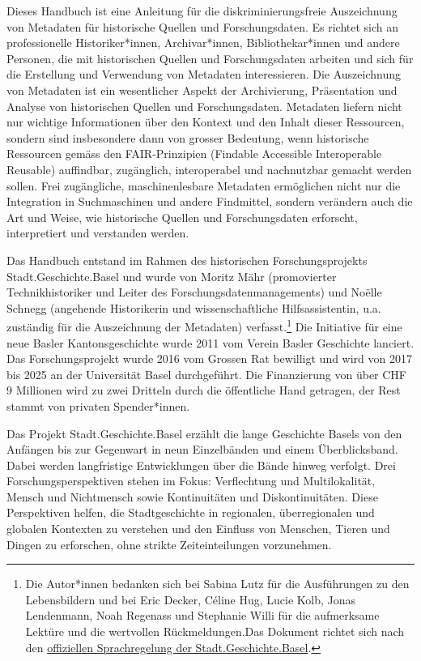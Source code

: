 \documentclass[
  letterpaper,
  DIV=11,
  numbers=noendperiod]{scrartcl}
\begin{document}
Dieses Handbuch ist eine Anleitung für die diskriminierungsfreie
Auszeichnung von Metadaten für historische Quellen und Forschungsdaten.
Es richtet sich an professionelle Historiker*innen, Archivar*innen,
Bibliothekar*innen und andere Personen, die mit historischen Quellen und
Forschungsdaten arbeiten und sich für die Erstellung und Verwendung von
Metadaten interessieren. Die Auszeichnung von Metadaten ist ein
wesentlicher Aspekt der Archivierung, Präsentation und Analyse von
historischen Quellen und Forschungsdaten. Metadaten liefern nicht nur
wichtige Informationen über den Kontext und den Inhalt dieser
Ressourcen, sondern sind insbesondere dann von grosser Bedeutung, wenn
historische Ressourcen gemäss den FAIR-Prinzipien (Findable Accessible
Interoperable Reusable) auffindbar, zugänglich, interoperabel und
nachnutzbar gemacht werden sollen. Frei zugängliche, maschinenlesbare
Metadaten ermöglichen nicht nur die Integration in Suchmaschinen und
andere Findmittel, sondern verändern auch die Art und Weise, wie
historische Quellen und Forschungsdaten erforscht, interpretiert und
verstanden werden.

Das Handbuch entstand im Rahmen des historischen Forschungsprojekts
Stadt.Geschichte.Basel und wurde von Moritz Mähr (promovierter
Technikhistoriker und Leiter des Forschungsdatenmanagements) und Noëlle
Schnegg (angehende Historikerin und wissenschaftliche Hilfsassistentin,
u.a. zuständig für die Auszeichnung der Metadaten) verfasst.\footnote{Die
  Autor*innen bedanken sich bei Sabina Lutz für die Ausführungen zu den
  Lebensbildern und bei Eric Decker, Céline Hug, Lucie Kolb, Jonas
  Lendenmann, Noah Regenass und Stephanie Willi für die aufmerksame
  Lektüre und die wertvollen Rückmeldungen.Das Dokument richtet sich
  nach den
  \href{https://stadtgeschichtebasel.ch/sprachregelung-der-stadt-geschichte-basel}{offiziellen
  Sprachregelung der Stadt.Geschichte.Basel}.} Die Initiative für eine
neue Basler Kantonsgeschichte wurde 2011 vom Verein Basler Geschichte
lanciert. Das Forschungsprojekt wurde 2016 vom Grossen Rat bewilligt und
wird von 2017 bis 2025 an der Universität Basel durchgeführt. Die
Finanzierung von über CHF 9 Millionen wird zu zwei Dritteln durch die
öffentliche Hand getragen, der Rest stammt von privaten Spender*innen.

Das Projekt Stadt.Geschichte.Basel erzählt die lange Geschichte Basels
von den Anfängen bis zur Gegenwart in neun Einzelbänden und einem
Überblicksband. Dabei werden langfristige Entwicklungen über die Bände
hinweg verfolgt. Drei Forschungsperspektiven stehen im Fokus:
Verflechtung und Multilokalität, Mensch und Nichtmensch sowie
Kontinuitäten und Diskontinuitäten. Diese Perspektiven helfen, die
Stadtgeschichte in regionalen, überregionalen und globalen Kontexten zu
verstehen und den Einfluss von Menschen, Tieren und Dingen zu
erforschen, ohne strikte Zeiteinteilungen vorzunehmen.
\end{document}
